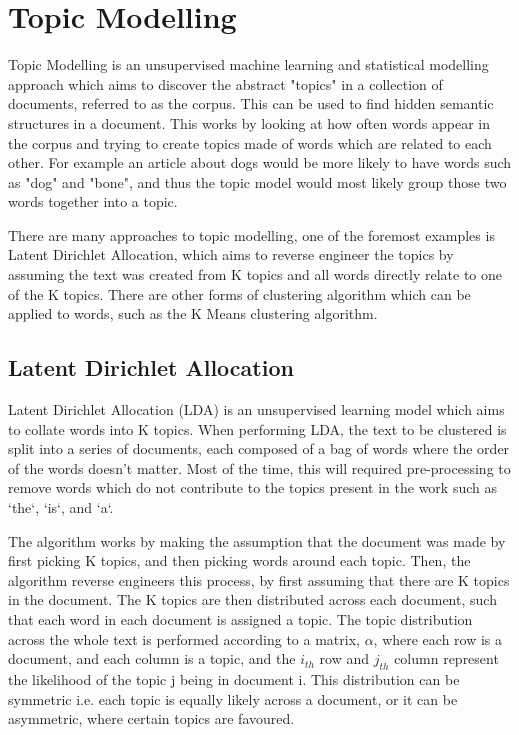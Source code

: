 \section{Topic Modelling}
Topic Modelling is an unsupervised machine learning and statistical modelling approach which aims to discover the abstract "topics" in a collection of documents, referred to as the corpus. This can be used to find hidden semantic structures in a document. This works by looking at how often words appear in the corpus and trying to create topics made of words which are related to each other. For example an article about dogs would be more likely to have words such as "dog" and "bone", and thus the topic model would most likely group those two words together into a topic. 

There are many approaches to topic modelling, one of the foremost examples is Latent Dirichlet Allocation, which aims to reverse engineer the topics by assuming the text was created from K topics and all words directly relate to one of the K topics. There are other forms of clustering algorithm which can be applied to words, such as the K Means clustering algorithm. 

\subsection{Latent Dirichlet Allocation}
Latent Dirichlet Allocation (LDA) is an unsupervised learning model which aims to collate words into K topics. When performing LDA, the text to be clustered is split into a series of documents, each composed of a bag of words where the order of the words doesn't matter. Most of the time, this will required pre-processing to remove words which do not contribute to the topics present in the work such as `the`, `is`,  and `a`. 

\noindent The algorithm works by making the assumption that the document was made by first picking K topics, and then picking words around each topic. Then, the algorithm reverse engineers this process, by first assuming that there are K topics in the document. The K topics are then distributed across each document, such that each word in each document is assigned a topic. The topic distribution across the whole text is performed according to a matrix, $\alpha$,  where each row is a document, and each column is a topic, and the $i_{th}$ row and $j_{th}$ column represent the likelihood of the topic j being in document i. This distribution can be symmetric i.e. each topic is equally likely across a document, or it can be asymmetric, where certain topics are favoured.

